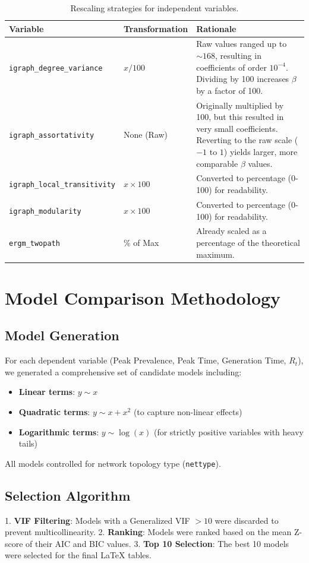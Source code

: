 \documentclass{article}
\begin{document}
\begin{table}[h]
\centering
\begin{tabular}{@{}llp{6cm}@{}}
\toprule
\textbf{Variable} & \textbf{Transformation} & \textbf{Rationale} \\ \midrule
\texttt{igraph\_degree\_variance} & $x / 100$ & Raw values ranged up to $\sim 168$, resulting in coefficients of order $10^{-4}$. Dividing by 100 increases $\beta$ by a factor of 100. \\
\texttt{igraph\_assortativity} & None (Raw) & Originally multiplied by 100, but this resulted in very small coefficients. Reverting to the raw scale ($-1$ to $1$) yields larger, more comparable $\beta$ values. \\
\texttt{igraph\_local\_transitivity} & $x \times 100$ & Converted to percentage (0-100) for readability. \\
\texttt{igraph\_modularity} & $x \times 100$ & Converted to percentage (0-100) for readability. \\
\texttt{ergm\_twopath} & \% of Max & Already scaled as a percentage of the theoretical maximum. \\
\bottomrule
\end{tabular}
\caption{Rescaling strategies for independent variables.}
\end{table}

\section{Model Comparison Methodology}

\subsection{Model Generation}
For each dependent variable (Peak Prevalence, Peak Time, Generation Time, $R_t$), we generated a comprehensive set of candidate models including:
\begin{itemize}
    \item \textbf{Linear terms}: $y \sim x$
    \item \textbf{Quadratic terms}: $y \sim x + x^2$ (to capture non-linear effects)
    \item \textbf{Logarithmic terms}: $y \sim \log(x)$ (for strictly positive variables with heavy tails)
\end{itemize}
All models controlled for network topology type (\texttt{nettype}).

\subsection{Selection Algorithm}
1.  \textbf{VIF Filtering}: Models with a Generalized VIF $> 10$ were discarded to prevent multicollinearity.
2.  \textbf{Ranking}: Models were ranked based on the mean Z-score of their AIC and BIC values.
3.  \textbf{Top 10 Selection}: The best 10 models were selected for the final \LaTeX{} tables.
\end{document}
